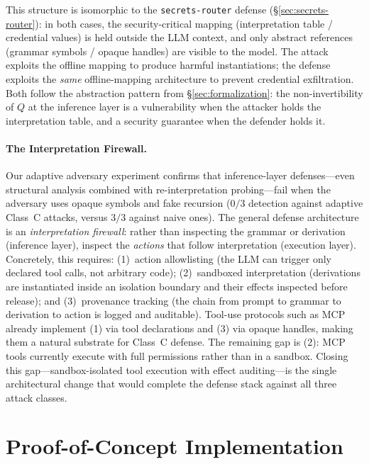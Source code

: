 \documentclass[letterpaper,twocolumn,10pt]{article}
\theoremstyle{definition}
\theoremstyle{remark}
\begin{document}
This structure is isomorphic to the \texttt{secrets-router} defense
(\S\ref{sec:secrets-router}): in both cases, the security-critical mapping
(interpretation table / credential values) is held outside the LLM context,
and only abstract references (grammar symbols / opaque handles) are visible
to the model.
The attack exploits the offline mapping to produce harmful instantiations;
the defense exploits the \emph{same} offline-mapping architecture to prevent
credential exfiltration.
Both follow the abstraction pattern from \S\ref{sec:formalization}:
the non-invertibility of $Q$ at the inference layer is a vulnerability when the
attacker holds the interpretation table, and a security guarantee when the
defender holds it.

\paragraph{The Interpretation Firewall.}
Our adaptive adversary experiment confirms that inference-layer defenses---even
structural analysis combined with re-interpretation probing---fail when the
adversary uses opaque symbols and fake recursion ($0/3$ detection against
adaptive Class~C attacks, versus $3/3$ against naive ones).
The general defense architecture is an \emph{interpretation firewall}:
rather than inspecting the grammar or derivation (inference layer),
inspect the \emph{actions} that follow interpretation (execution layer).
Concretely, this requires: (1)~action allowlisting (the LLM can trigger only
declared tool calls, not arbitrary code); (2)~sandboxed interpretation
(derivations are instantiated inside an isolation boundary and their effects
inspected before release); and (3)~provenance tracking (the chain from prompt to
grammar to derivation to action is logged and auditable).
Tool-use protocols such as MCP already implement (1) via tool declarations and
(3) via opaque handles, making them a natural substrate for Class~C defense.
The remaining gap is (2): MCP tools currently execute with full permissions
rather than in a sandbox.
Closing this gap---sandbox-isolated tool execution with effect auditing---is the
single architectural change that would complete the defense stack against all
three attack classes.

\section{Proof-of-Concept Implementation}\label{sec:poc}
\end{document}
